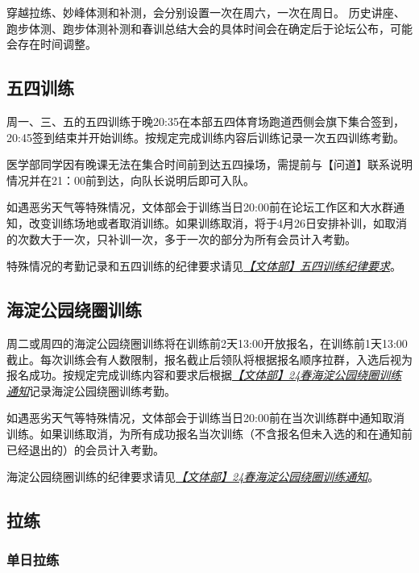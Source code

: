 \documentclass[UTF8]{ctexart}
\begin{document}
\begin{table}[h]
{\begin{tabular}
    \end{tabular}%
    }
\end{table}

穿越拉练、妙峰体测和补测，会分别设置一次在周六，一次在周日。
历史讲座、跑步体测、跑步体测补测和春训总结大会的具体时间会在确定后于论坛公布，可能会存在时间调整。

\subsection{五四训练}

周一、三、五的五四训练于晚20:35在本部五四体育场跑道西侧会旗下集合签到，20:45签到结束并开始训练。按规定完成训练内容后训练记录一次五四训练考勤。

医学部同学因有晚课无法在集合时间前到达五四操场，需提前与【问道】联系说明情况并在21：00前到达，向队长说明后即可入队。

如遇恶劣天气等特殊情况，文体部会于训练当日20:00前在论坛工作区和大水群通知，改变训练场地或者取消训练。如果训练取消，将于4月26日安排补训，如取消的次数大于一次，只补训一次，多于一次的部分为所有会员计入考勤。

特殊情况的考勤记录和五四训练的纪律要求请见\href{https://chexie.net/bbs/content/index.php?bid=1\&tid=9576\&p=1}{\textit{【文体部】五四训练纪律要求}}。


\subsection{海淀公园绕圈训练}

周二或周四的海淀公园绕圈训练将在训练前2天13:00开放报名，在训练前1天13:00截止。每次训练会有人数限制，报名截止后领队将根据报名顺序拉群，入选后视为报名成功。按规定完成训练内容和要求后根据\href{https://chexie.net/bbs/content/?bid=1&tid=9743&p=1}{\textit{【文体部】24春海淀公园绕圈训练通知}}记录海淀公园绕圈训练考勤。

如遇恶劣天气等特殊情况，文体部会于训练当日20:00前在当次训练群中通知取消训练。如果训练取消，为所有成功报名当次训练（不含报名但未入选的和在通知前已经退出的）的会员计入考勤。

海淀公园绕圈训练的纪律要求请见\href{https://chexie.net/bbs/content/?bid=1&tid=9743&p=1}{\textit{【文体部】24春海淀公园绕圈训练通知}}。

\subsection{拉练}

\subsubsection{单日拉练}
\end{document}
